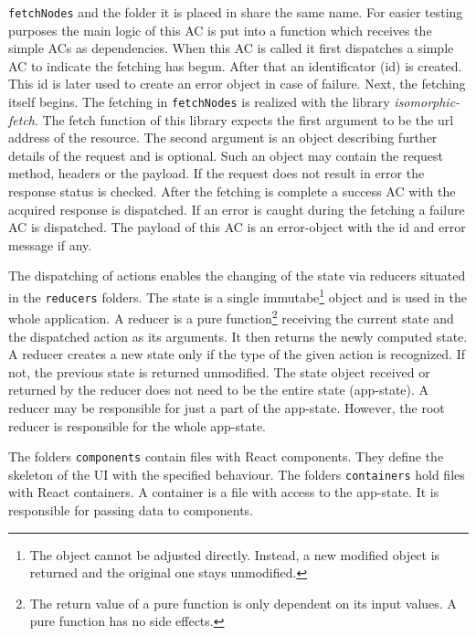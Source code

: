\texttt{fetchNodes} and the folder it is placed in share the same name. For easier testing purposes the main logic of this AC is put into a function which receives the simple ACs as dependencies. When this AC is called it first dispatches a simple AC to indicate the fetching has begun. After that an identificator (id) is created. This id is later used to create an error object in case of failure. Next, the fetching itself begins. The fetching in \texttt{fetchNodes} is realized with the library \textit{isomorphic-fetch}. The fetch function of this library expects the first argument to be the url address of the resource. The second argument is an object describing further details of the request and is optional. Such an object may contain the request method, headers or the payload. If the request does not result in error the response status is checked. After the fetching is complete a success AC with the acquired response is dispatched. If an error is caught during the fetching a failure AC is dispatched. The payload of this AC is an error-object with the id and error message if any.

The dispatching of actions enables the changing of the state via reducers situated in the \texttt{reducers} folders. The state is a single immutabe\footnote{The object cannot be adjusted directly. Instead, a new modified object is returned and the original one stays unmodified.} object and is used in the whole application. A \hypertarget{reducers}{reducer} is a pure function\footnote{The return value of a pure function is only dependent on its input values. A pure function has no side effects.} receiving the current state and the dispatched action as its arguments. It then returns the newly computed state. A reducer creates a new state only if the type of the given action is recognized. If not, the previous state is returned unmodified. The state object received or returned by the reducer does not need to be the entire state (app-state). A reducer may be responsible for just a part of the app-state. However, the root reducer is responsible for the whole app-state.

The folders \texttt{components} contain files with React components. They define the skeleton of the UI with the specified behaviour. The folders \texttt{containers} hold files with React containers. A container is a file with access to the app-state. It is responsible for passing data to components. 
